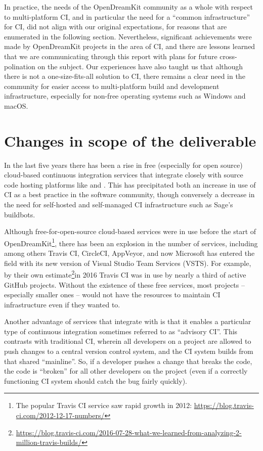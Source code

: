 \documentclass{deliverablereport}
\begin{document}
In practice, the needs of the OpenDreamKit community as a whole with respect to
multi-platform CI, and in particular the need for a ``common infrastructure''
for CI, did not align with our original expectations, for reasons that are
enumerated in the following section.  Nevertheless, significant achievements
were made by OpenDreamKit projects in the area of CI, and there are lessons
learned that we are communicating through this report with plans for future
cross-polination on the subject.  Our experiences have also taught us that
although there is not a one-size-fits-all solution to CI, there remains a clear
need in the community for easier access to multi-platform build and development
infrastructure, especially for non-free operating systems such as Windows and macOS.

\hypertarget{changes-to-deliverable}{%
\section{Changes in scope of the deliverable}\label{changes-to-deliverable}}

In the last five years there has been a rise in free (especially for open
source) cloud-based continuous integration services that integrate closely with
source code hosting platforms like \GitHub and \GitLab.  This has precipitated
both an increase in use of CI as a best practice in the software community,
though conversely a decrease in the need for self-hosted and self-managed CI
infrastructure such as Sage's buildbots.

Although free-for-open-source cloud-based services were in use before the start
of OpenDreamKit\footnote{The popular Travis CI service saw rapid growth in
2012: \url{https://blog.travis-ci.com/2012-12-17-numbers/}}, there has been an
explosion in the number of services, including among others Travis CI,
CircleCI, AppVeyor, and now Microsoft has entered the field with its new
version of Visual Studio Team Services (VSTS).  For example, by their own
estimate\footnote{\url{https://blog.travis-ci.com/2016-07-28-what-we-learned-from-analyzing-2-million-travis-builds/}}in
2016 Travis CI was in use by nearly a third of active GitHub projects.  Without
the existence of these free services, most projects -- especially smaller
ones -- would not have the resources to maintain CI infrastructure even if they
wanted to.

Another advantage of services that integrate with \GitHub is that it enables a
particular type of continuous integration sometimes referred to as ``advisory
CI''.  This contrasts with traditional CI, wherein all developers on a project
are allowed to push changes to a central version control system, and the CI
system builds from that shared ``mainline''.  So, if a developer
pushes a change that breaks the code, the code is ``broken''
for all other developers on the project (even if a correctly functioning CI
system should catch the bug fairly quickly).
\end{document}
